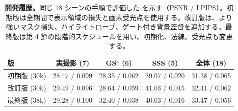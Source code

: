 \begin{table}[t]
\caption{\textbf{開発履歴。}同じ 18 シーンの手順で評価した \ours を示す（PSNR / LPIPS）。初期版は全期間で表示領域の損失と画素受光点を使用する。改訂版は、より強いマスク損失、ハイライトローブ、ゲート付き背景監督を追加する。最終版は第 4 節の段階的スケジュールを用い、初期化、法線、受光点も変更する。}
\label{tab:supp_history}
\centering\scriptsize
\setlength{\tabcolsep}{2.5pt}
\begin{tabular}{@{}lcccc@{}}
\toprule
版 & 実撮影 (7) & GS$^3$ (6) & SSS (5) & 全体 (18) \\
\midrule
初期版 (30k) & 28.47 / 0.099 & 28.35 / 0.062 & 39.07 / 0.020 & 31.38 / 0.065 \\
改訂版 (30k) & 29.49 / 0.096 & 28.64 / 0.059 & 41.03 / 0.015 & 32.41 / 0.062 \\
最終版 (38k) & 29.28 / 0.100 & 32.40 / 0.038 & 40.63 / 0.016 & 33.47 / 0.056 \\
\bottomrule
\end{tabular}
\end{table}
